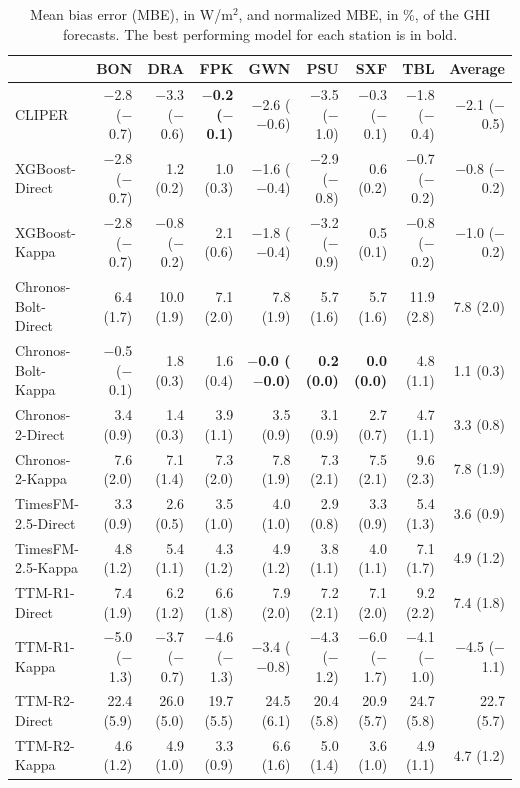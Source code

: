 \documentclass[number, 3p, 10pt, times]{elsarticle}
\begin{document}
\begin{table}[!ht]
\centering
\caption{Mean bias error (MBE), in W/m$^2$, and normalized MBE, in \%, of the GHI forecasts. The best performing model for each station is in bold.}
\label{tb:MBEGh}
\footnotesize
\begin{tabular}{lrrrrrrrr}
\toprule
 & BON & DRA & FPK & GWN & PSU & SXF & TBL & Average \\
\midrule
CLIPER & $-$2.8 ($-$0.7) & $-$3.3 ($-$0.6) & \textbf{$-$0.2 ($-$0.1)} & $-$2.6 ($-$0.6) & $-$3.5 ($-$1.0) & $-$0.3 ($-$0.1) & $-$1.8 ($-$0.4) & $-$2.1 ($-$0.5) \\
XGBoost-Direct & $-$2.8 ($-$0.7) & 1.2 (0.2) & 1.0 (0.3) & $-$1.6 ($-$0.4) & $-$2.9 ($-$0.8) & 0.6 (0.2) & $-$0.7 ($-$0.2) & $-$0.8 ($-$0.2) \\
XGBoost-Kappa & $-$2.8 ($-$0.7) & $-$0.8 ($-$0.2) & 2.1 (0.6) & $-$1.8 ($-$0.4) & $-$3.2 ($-$0.9) & 0.5 (0.1) & $-$0.8 ($-$0.2) & $-$1.0 ($-$0.2) \\
Chronos-Bolt-Direct & 6.4 (1.7) & 10.0 (1.9) & 7.1 (2.0) & 7.8 (1.9) & 5.7 (1.6) & 5.7 (1.6) & 11.9 (2.8) & 7.8 (2.0) \\
Chronos-Bolt-Kappa & $-$0.5 ($-$0.1) & 1.8 (0.3) & 1.6 (0.4) & \textbf{$-$0.0 ($-$0.0)} & \textbf{0.2 (0.0)} & \textbf{0.0 (0.0)} & 4.8 (1.1) & 1.1 (0.3) \\
Chronos-2-Direct & 3.4 (0.9) & 1.4 (0.3) & 3.9 (1.1) & 3.5 (0.9) & 3.1 (0.9) & 2.7 (0.7) & 4.7 (1.1) & 3.3 (0.8) \\
Chronos-2-Kappa & 7.6 (2.0) & 7.1 (1.4) & 7.3 (2.0) & 7.8 (1.9) & 7.3 (2.1) & 7.5 (2.1) & 9.6 (2.3) & 7.8 (1.9) \\
TimesFM-2.5-Direct & 3.3 (0.9) & 2.6 (0.5) & 3.5 (1.0) & 4.0 (1.0) & 2.9 (0.8) & 3.3 (0.9) & 5.4 (1.3) & 3.6 (0.9) \\
TimesFM-2.5-Kappa & 4.8 (1.2) & 5.4 (1.1) & 4.3 (1.2) & 4.9 (1.2) & 3.8 (1.1) & 4.0 (1.1) & 7.1 (1.7) & 4.9 (1.2) \\
TTM-R1-Direct & 7.4 (1.9) & 6.2 (1.2) & 6.6 (1.8) & 7.9 (2.0) & 7.2 (2.1) & 7.1 (2.0) & 9.2 (2.2) & 7.4 (1.8) \\
TTM-R1-Kappa & $-$5.0 ($-$1.3) & $-$3.7 ($-$0.7) & $-$4.6 ($-$1.3) & $-$3.4 ($-$0.8) & $-$4.3 ($-$1.2) & $-$6.0 ($-$1.7) & $-$4.1 ($-$1.0) & $-$4.5 ($-$1.1) \\
TTM-R2-Direct & 22.4 (5.9) & 26.0 (5.0) & 19.7 (5.5) & 24.5 (6.1) & 20.4 (5.8) & 20.9 (5.7) & 24.7 (5.8) & 22.7 (5.7) \\
TTM-R2-Kappa & 4.6 (1.2) & 4.9 (1.0) & 3.3 (0.9) & 6.6 (1.6) & 5.0 (1.4) & 3.6 (1.0) & 4.9 (1.1) & 4.7 (1.2) \\

\end{tabular}
\end{table}
\end{document}
